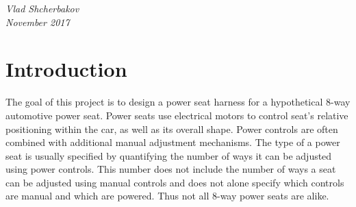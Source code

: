 \documentclass[12pt,letterpaper]{article}
\begin{document}
\begin{titlepage}
	\vfill %
	
	
	\parbox[t]{0.93\textwidth}{ %
		\raggedleft %
		\textit{
		  Vlad Shcherbakov \\
		  November 2017
		}
		
	}
	
\end{titlepage}
\section{Introduction}
The goal of this project is to design a power seat harness for a hypothetical 8-way automotive power seat. Power seats use electrical motors to control seat’s relative positioning within the car, as well as its overall shape. Power controls are often combined with additional manual adjustment mechanisms. The type of a power seat is usually specified by quantifying the number of ways it can be adjusted using power controls. This number does not include the number of ways a seat can be adjusted using manual controls and does not alone specify which controls are manual and which are powered. Thus not all 8-way power seats are alike.
\end{document}
